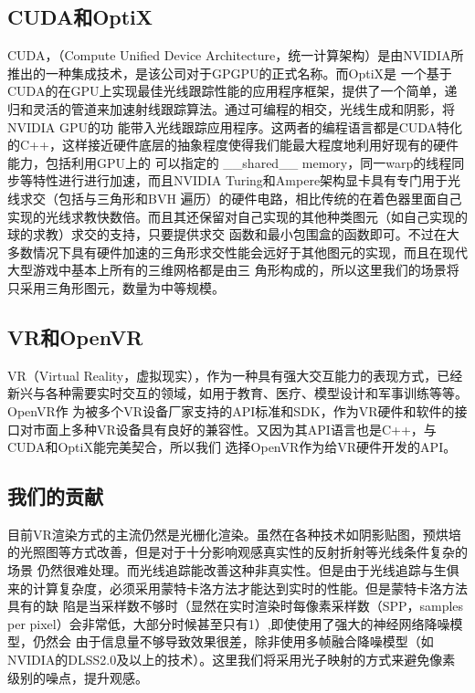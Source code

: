 \documentclass[UTF8]{ctexart}
\begin{document}
    \subsection{CUDA和OptiX}
        CUDA，（Compute Unified Device Architecture，统一计算架构）是由NVIDIA所推出的一种集成技术，是该公司对于GPGPU的正式名称。而OptiX\cite{2010OptiX}是
        一个基于CUDA的在GPU上实现最佳光线跟踪性能的应用程序框架，提供了一个简单，递归和灵活的管道来加速射线跟踪算法。通过可编程的相交，光线生成和阴影，将NVIDIA GPU的功
        能带入光线跟踪应用程序。这两者的编程语言都是CUDA特化的C++，这样接近硬件底层的抽象程度使得我们能最大程度地利用好现有的硬件能力，包括利用GPU上的
        可以指定的 \_\_shared\_\_ memory，同一warp的线程同步等特性进行进行加速，而且NVIDIA Turing和Ampere架构显卡具有专门用于光线求交（包括与三角形和BVH
        遍历）的硬件电路，相比传统的在着色器里面自己实现的光线求教快数倍。而且其还保留对自己实现的其他种类图元（如自己实现的球的求教）求交的支持，只要提供求交
        函数和最小包围盒的函数即可。不过在大多数情况下具有硬件加速的三角形求交性能会远好于其他图元的实现，而且在现代大型游戏中基本上所有的三维网格都是由三
        角形构成的，所以这里我们的场景将只采用三角形图元，数量为中等规模。
    \subsection{VR和OpenVR}
        VR（Virtual Reality，虚拟现实），作为一种具有强大交互能力的表现方式，已经新兴与各种需要实时交互的领域，如用于教育、医疗、模型设计和军事训练等等。OpenVR作
        为被多个VR设备厂家支持的API标准和SDK，作为VR硬件和软件的接口对市面上多种VR设备具有良好的兼容性。又因为其API语言也是C++，与CUDA和OptiX能完美契合，所以我们
        选择OpenVR作为给VR硬件开发的API。
    \subsection{我们的贡献}
        目前VR渲染方式的主流仍然是光栅化渲染。虽然在各种技术如阴影贴图，预烘培的光照图等方式改善，但是对于十分影响观感真实性的反射折射等光线条件复杂的场景
        仍然很难处理。而光线追踪能改善这种非真实性。但是由于光线追踪与生俱来的计算复杂度，必须采用蒙特卡洛方法才能达到实时的性能。但是蒙特卡洛方法具有的缺
        陷是当采样数不够时（显然在实时渲染时每像素采样数（SPP，samples per pixel）会非常低，大部分时候甚至只有1）,即使使用了强大的神经网络降噪模型，仍然会
        由于信息量不够导致效果很差，除非使用多帧融合降噪模型（如NVIDIA的DLSS2.0及以上的技术）。这里我们将采用光子映射的方式来避免像素级别的噪点，提升观感。
        
\end{document}
